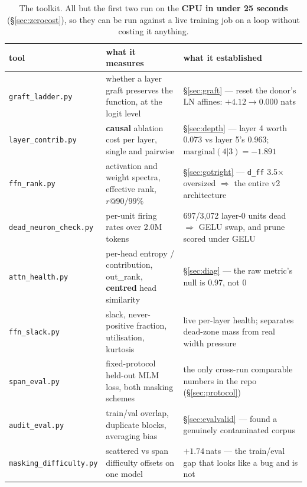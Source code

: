 \documentclass[11pt,a4paper]{article}
\newcommand{\dff}{\texttt{d\_ff}}
\newcommand{\nats}[1]{\ensuremath{#1}\,nats}
\begin{document}
\begin{table}[H]
\centering\footnotesize\setlength{\tabcolsep}{4pt}
\newcommand{\rr}[1]{\raggedright\arraybackslash #1}%
\begin{tabular}{>{\raggedright\arraybackslash}p{}>{\raggedright\arraybackslash}p{}>{\raggedright\arraybackslash}p{}}
\toprule
tool & what it measures & what it established \\
\midrule
\texttt{graft\_ladder.py} & whether a layer graft preserves the function, at the logit level & \S\ref{sec:graft} --- reset the donor's LN affines: $+4.12 \to 0.000$ nats \\
\texttt{layer\_contrib.py} & \textbf{causal} ablation cost per layer, single and pairwise & \S\ref{sec:depth} --- layer 4 worth 0.073 vs layer 5's 0.963; $\mathrm{marginal}(4|3) = -1.891$ \\
\texttt{ffn\_rank.py} & activation and weight spectra, effective rank, $r@90/99\%$ & \S\ref{sec:gotright} --- \dff{} 3.5$\times$ oversized $\Rightarrow$ the entire v2 architecture \\
\texttt{dead\_neuron\_\allowbreak check.py} & per-unit firing rates over 2.0M tokens & 2{,}697/3{,}072 layer-0 units dead $\Rightarrow$ GELU swap, and prune scored under GELU \\
\texttt{attn\_health.py} & per-head entropy / contribution, out\_rank, \textbf{centred} head similarity & \S\ref{sec:diag} --- the raw metric's null is 0.97, not 0 \\
\texttt{ffn\_slack.py} & slack, never-positive fraction, utilisation, kurtosis & live per-layer health; separates dead-zone mass from real width pressure \\
\texttt{span\_eval.py} & fixed-protocol held-out MLM loss, both masking schemes & the only cross-run comparable numbers in the repo (\S\ref{sec:protocol}) \\
\texttt{audit\_eval.py} & train/val overlap, duplicate blocks, averaging bias & \S\ref{sec:evalvalid} --- found a genuinely contaminated corpus \\
\texttt{masking\_\allowbreak difficulty.py} & scattered vs span difficulty offsets on one model & \nats{{+}1.74} --- the train/eval gap that looks like a bug and is not \\
\bottomrule
\end{tabular}
\caption{The toolkit. All but the first two run on the \textbf{CPU in under 25 seconds}
(\S\ref{sec:zerocost}), so they can be run against a live training job on a loop without
costing it anything.}
\end{table}
\end{document}
